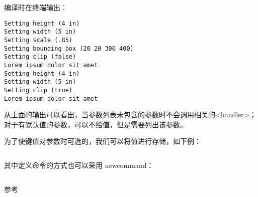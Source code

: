 \inputminted[linenos]{latex}{examples/programming/keyval-commands-with-parameters.tex}

编译时在终端输出：

\begin{verbatim}
Setting height (4 in)
Setting width (5 in)
Setting scale (.85)
Setting bounding box (20 20 300 400)
Setting clip (false)
Lorem ipsum dolor sit amet
Setting height (4 in)
Setting width (5 in)
Setting clip (true)
Lorem ipsum dolor sit amet
\end{verbatim}

从上面的输出可以看出，当参数列表未包含的参数时不会调用相关的{\ttfamily <handler>}；
对于有默认值的参数，可以不给值，但是需要列出该参数。

为了使键值对参数时可选的，我们可以将值进行存储，如下例：

\inputminted[linenos]{latex}{examples/programming/keyval-commands-with-optional-parameters1.tex}

其中定义命令的方式也可以采用 {\ttfamily newcommand}：

\inputminted[firstline=30,lastline=42]{latex}{examples/programming/keyval-commands-with-optional-parameters2.tex}



参考\cite{WIKIBOOKS}

